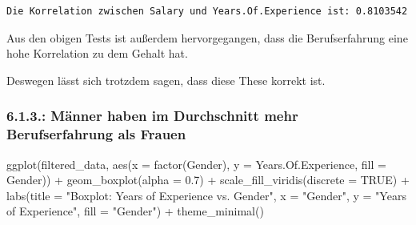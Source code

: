 \documentclass[
  letterpaper,
  DIV=11,
  numbers=noendperiod]{scrartcl}
\newenvironment{Shaded}{\begin{snugshade}}{\end{snugshade}}
\newcommand{\AttributeTok}[1]{\textcolor[rgb]{0.40,0.45,0.13}{#1}}
\newcommand{\ConstantTok}[1]{\textcolor[rgb]{0.56,0.35,0.01}{#1}}
\newcommand{\FloatTok}[1]{\textcolor[rgb]{0.68,0.00,0.00}{#1}}
\newcommand{\FunctionTok}[1]{\textcolor[rgb]{0.28,0.35,0.67}{#1}}
\newcommand{\NormalTok}[1]{\textcolor[rgb]{0.00,0.23,0.31}{#1}}
\newcommand{\OtherTok}[1]{\textcolor[rgb]{0.00,0.23,0.31}{#1}}
\newcommand{\SpecialCharTok}[1]{\textcolor[rgb]{0.37,0.37,0.37}{#1}}
\newcommand{\StringTok}[1]{\textcolor[rgb]{0.13,0.47,0.30}{#1}}
\begin{document}
\begin{Shaded}
\end{Shaded}

\begin{verbatim}
Die Korrelation zwischen Salary und Years.Of.Experience ist: 0.8103542 
\end{verbatim}

Aus den obigen Tests ist außerdem hervorgegangen, dass die
Berufserfahrung eine hohe Korrelation zu dem Gehalt hat.

Deswegen lässt sich trotzdem sagen, dass diese These korrekt ist.

\hypertarget{muxe4nner-haben-im-durchschnitt-mehr-berufserfahrung-als-frauen}{%
\subsubsection{6.1.3.: Männer haben im Durchschnitt mehr Berufserfahrung
als
Frauen}\label{muxe4nner-haben-im-durchschnitt-mehr-berufserfahrung-als-frauen}}

\begin{Shaded}
\begin{Highlighting}[]
\FunctionTok{ggplot}\NormalTok{(filtered\_data, }\FunctionTok{aes}\NormalTok{(}\AttributeTok{x =} \FunctionTok{factor}\NormalTok{(Gender), }\AttributeTok{y =}\NormalTok{ Years.Of.Experience, }\AttributeTok{fill =}\NormalTok{ Gender)) }\SpecialCharTok{+}
  \FunctionTok{geom\_boxplot}\NormalTok{(}\AttributeTok{alpha =} \FloatTok{0.7}\NormalTok{) }\SpecialCharTok{+}
  \FunctionTok{scale\_fill\_viridis}\NormalTok{(}\AttributeTok{discrete =} \ConstantTok{TRUE}\NormalTok{) }\SpecialCharTok{+}
  \FunctionTok{labs}\NormalTok{(}\AttributeTok{title =} \StringTok{"Boxplot: Years of Experience vs. Gender"}\NormalTok{,}
       \AttributeTok{x =} \StringTok{"Gender"}\NormalTok{,}
       \AttributeTok{y =} \StringTok{"Years of Experience"}\NormalTok{,}
       \AttributeTok{fill =} \StringTok{"Gender"}\NormalTok{) }\SpecialCharTok{+}
  \FunctionTok{theme\_minimal}\NormalTok{()}
\end{Highlighting}
\end{Shaded}
\end{document}
